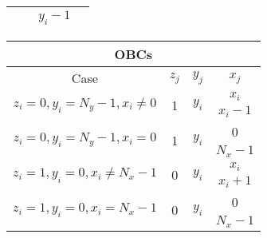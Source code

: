 \begin{table}[H]
\begin{tabular}{|c|c|c|c|}
	   	\multicolumn{1}{|c|}{}	& \multicolumn{1}{c|}{} & $y_i -1$ & \multicolumn{1}{c|}{\multirow{2}{*}{}} \\ \hline
	\end{tabular}
	\hspace{-0.1cm}
	\begin{tabular}{|c|c|c|c|} \hline
	\multicolumn{4}{|c|}{\textbf{\acp{OBC}}}							\\ \hline
		Case 				& $z_j$	& $y_j$	& $x_j$ 	\\ \hline
	\multicolumn{1}{|c|}{\multirow{2}{*}{$z_i = 0, y_i = N_y - 1, x_i \neq 0$}}	 &	\multicolumn{1}{c|}{\multirow{2}{*}{1}} & \multicolumn{1}{c|}{\multirow{2}{*}{$y_i$}} & $x_i$   \\ \cline{4-4}
	   	\multicolumn{1}{|c|}{}	& \multicolumn{1}{c|}{\multirow{2}{*}{}}  & \multicolumn{1}{c|}{}& $x_i - 1$ \\ \hline
	   	\multicolumn{1}{|c|}{\multirow{2}{*}{$z_i = 0, y_i = N_y - 1, x_i = 0$}}	 &	\multicolumn{1}{c|}{\multirow{2}{*}{1}} & \multicolumn{1}{c|}{\multirow{2}{*}{$y_i$}} & 0   \\ \cline{4-4}
	   	\multicolumn{1}{|c|}{}	& \multicolumn{1}{c|}{\multirow{2}{*}{}}  & \multicolumn{1}{c|}{}& $N_x - 1$ \\ \hline
	   	\multicolumn{1}{|c|}{\multirow{2}{*}{$z_i = 1, y_i = 0, x_i \neq N_x - 1$}}	 &	\multicolumn{1}{c|}{\multirow{2}{*}{0}} & \multicolumn{1}{c|}{\multirow{2}{*}{$y_i$}} & $x_i$   \\ \cline{4-4}
	   	\multicolumn{1}{|c|}{}	& \multicolumn{1}{c|}{\multirow{2}{*}{}}  & \multicolumn{1}{c|}{}& $x_i + 1$  \\ \hline
	   	\multicolumn{1}{|c|}{\multirow{2}{*}{$z_i = 1, y_i = 0, x_i = N_x - 1$}}	 &	\multicolumn{1}{c|}{\multirow{2}{*}{0}} & \multicolumn{1}{c|}{\multirow{2}{*}{$y_i$}} & 0   \\ \cline{4-4}
	   	\multicolumn{1}{|c|}{}	& \multicolumn{1}{c|}{\multirow{2}{*}{}}  & \multicolumn{1}{c|}{}& $N_x - 1$ \\ \hline
	\end{tabular}
	\label{tab:dummytable}
\end{table}



